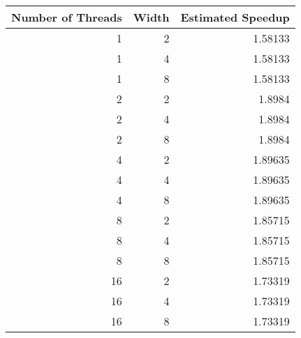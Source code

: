 \begin{tabular}{rrr}
\hline
   Number of Threads &   Width &   Estimated Speedup \\
\hline
                   1 &       2 &             1.58133 \\
                   1 &       4 &             1.58133 \\
                   1 &       8 &             1.58133 \\
                   2 &       2 &             1.8984  \\
                   2 &       4 &             1.8984  \\
                   2 &       8 &             1.8984  \\
                   4 &       2 &             1.89635 \\
                   4 &       4 &             1.89635 \\
                   4 &       8 &             1.89635 \\
                   8 &       2 &             1.85715 \\
                   8 &       4 &             1.85715 \\
                   8 &       8 &             1.85715 \\
                  16 &       2 &             1.73319 \\
                  16 &       4 &             1.73319 \\
                  16 &       8 &             1.73319 \\
\hline
\end{tabular}